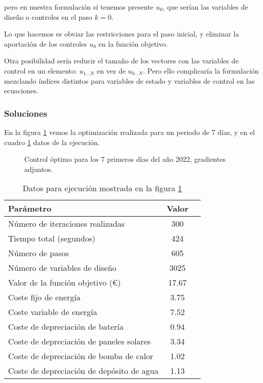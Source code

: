 pero en nuestra formulación sí tenemos presente $u_0$, que serían las variables
de diseño o controles en el paso $k=0$.

Lo que hacemos es obviar las restricciones para el paso inicial, y eliminar la
aportación de los controles $u_0$ en la función objetivo.

Otra posibilidad sería reducir el tamaño de los vectores con las variables de
control en un elemento: $u_{1 \ldots N}$ en vez de $u_{0 \ldots N}$. Pero ello
complicaría la formulación mezclando índices distintos para variables de estado
y variables de control en las ecuaciones.


\subsubsection{Soluciones}

En la figura \ref{fig:control_adjoints_7_days} vemos la optimización realizada
para un periodo de 7 días, y en el cuadro \ref{tab:control_adjoints_7_days}
datos de la ejecución.

\begin{figure}[h] \centering
	\centering
	
	\caption{Control óptimo para los 7 primeros días del año 2022, gradientes adjuntos.}
	\label{fig:control_adjoints_7_days}
\end{figure}

\begin{table}[ht]
	\centering
	\caption{Datos para ejecución mostrada en la figura \ref{fig:control_adjoints_7_days}}
	\label{tab:control_adjoints_7_days}
	\begin{tabular}{@{}lcc@{}}
		\toprule
		Parámetro                                 & Valor \\
		\midrule
		Número de iteraciones realizadas          & 300   \\
		Tiempo total (segundos)                   & 424   \\
		Número de pasos                           & 605   \\
		Número de variables de diseño             & 3025  \\
		\midrule
		Valor de la función objetivo (€)          & 17.67 \\
		\midrule
		Coste fijo de energía                     & 3.75  \\
		Coste variable de energía                 & 7.52  \\
		Coste de depreciación de batería          & 0.94  \\
		Coste de depreciación de paneles solares  & 3.34  \\
		Coste de depreciación de bomba de calor   & 1.02  \\
		Coste de depreciación de depósito de agua & 1.13  \\
		\bottomrule
	\end{tabular}
\end{table}


